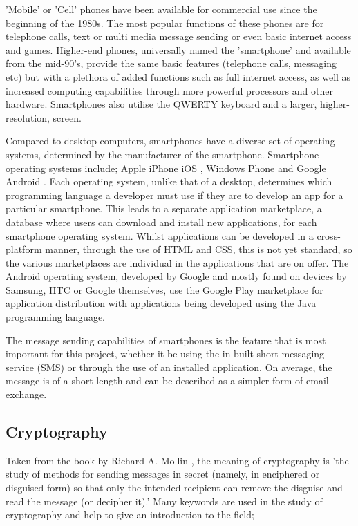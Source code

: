 \documentclass[a4paper,12pt]{report}
\begin{document}
'Mobile' or 'Cell' phones have been available for commercial use since the beginning of the 1980s. The most popular functions of these phones are for telephone calls, text or multi media message sending or even basic internet access and games. Higher-end phones, universally named the 'smartphone' and available from the mid-90's, provide the same basic features (telephone calls, messaging etc) but with a plethora of added functions such as full internet access, as well as increased computing capabilities through more powerful processors and other hardware. Smartphones also utilise the QWERTY keyboard and a larger, higher-resolution, screen. 

Compared to desktop computers, smartphones have a diverse set of operating systems, determined by the manufacturer of the smartphone. Smartphone operating systems include; Apple iPhone iOS \cite{appleios}, Windows Phone \cite{windowsphone} and Google Android \cite{googleandroid}. Each operating system, unlike that of a desktop, determines which programming language a developer must use if they are to develop an app for a particular smartphone. This leads to a separate application marketplace, a database where users can download and install new applications, for each smartphone operating system. Whilst applications can be developed in a cross-platform manner, through the use of HTML and CSS, this is not yet standard, so the various marketplaces are individual in the applications that are on offer. The Android operating system, developed by Google and mostly found on devices by Samsung, HTC or Google themselves, use the Google Play marketplace \cite{googleplay} for application distribution with applications being developed using the Java programming language.

The message sending capabilities of smartphones is the feature that is most important for this project, whether it be using the in-built short messaging service (SMS) or through the use of an installed application. On average, the message is of a short length and can be described as a simpler form of email exchange. 

\subsection{Cryptography}

Taken from the book by Richard A. Mollin \cite{richardmollin}, the meaning of cryptography is 'the study of methods for sending messages in secret (namely, in enciphered or disguised form) so that only the intended recipient can remove the disguise and read the message (or decipher it).' Many keywords are used in the study of cryptography and help to give an introduction to the field; 
\end{document}

